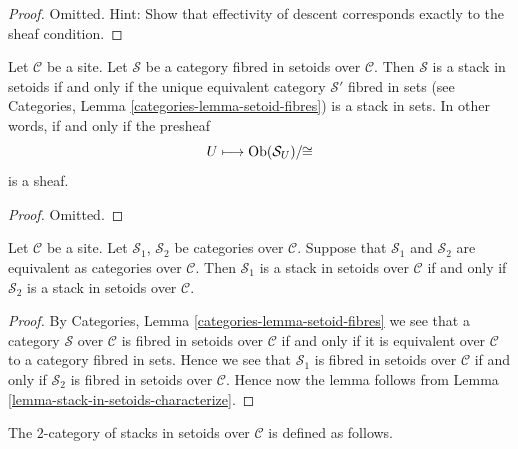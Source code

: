 \begin{proof}
Omitted. Hint: Show that effectivity of descent corresponds exactly to
the sheaf condition.
\end{proof}

\begin{lemma}
\label{lemma-stack-in-setoids-characterize}
Let $\mathcal{C}$ be a site.
Let $\mathcal{S}$ be a category fibred in setoids over $\mathcal{C}$.
Then $\mathcal{S}$ is a stack in setoids if and only if the unique
equivalent category $\mathcal{S}'$ fibred in sets (see
Categories, Lemma \ref{categories-lemma-setoid-fibres})
is a stack in sets. In other words, if and only if the presheaf
$$
U \longmapsto \mathop{\mathrm{Ob}}\nolimits(\mathcal{S}_U)/\!\!\cong
$$
is a sheaf.
\end{lemma}

\begin{proof}
Omitted.
\end{proof}

\begin{lemma}
\label{lemma-stack-in-setoids-equivalent}
Let $\mathcal{C}$ be a site.
Let $\mathcal{S}_1$, $\mathcal{S}_2$ be categories over $\mathcal{C}$.
Suppose that $\mathcal{S}_1$ and $\mathcal{S}_2$ are equivalent
as categories over $\mathcal{C}$.
Then $\mathcal{S}_1$ is a stack in setoids over $\mathcal{C}$ if and only if
$\mathcal{S}_2$ is a stack in setoids over $\mathcal{C}$.
\end{lemma}

\begin{proof}
By
Categories, Lemma \ref{categories-lemma-setoid-fibres}
we see that a category $\mathcal{S}$ over $\mathcal{C}$ is fibred in setoids
over $\mathcal{C}$ if and only if it is equivalent over $\mathcal{C}$
to a category fibred in sets.
Hence we see that $\mathcal{S}_1$ is fibred in setoids over $\mathcal{C}$
if and only if $\mathcal{S}_2$ is fibred in setoids over $\mathcal{C}$.
Hence now the lemma follows from
Lemma \ref{lemma-stack-in-setoids-characterize}.
\end{proof}

\noindent
The $2$-category of stacks in setoids over $\mathcal{C}$
is defined as follows.

